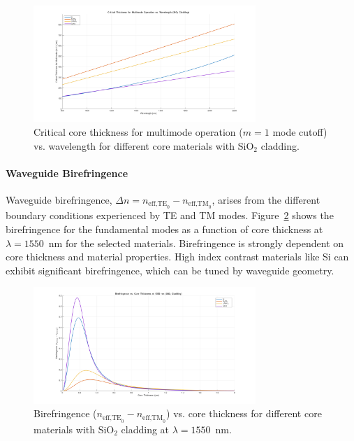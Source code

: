 \documentclass[10pt, a4paper]{article}
\begin{document}
\begin{figure}[h!]
    \centering
    \includegraphics[width=0.75\textwidth]{task1/critical_thickness_multimode_vs_wavelength_materials.png}
    \caption{Critical core thickness for multimode operation ($m=1$ mode cutoff) vs. wavelength for different core materials with SiO$_2$ cladding.}
    \label{fig:critical_thickness_multimode_vs_wavelength_materials}
\end{figure}

\paragraph{Waveguide Birefringence}
Waveguide birefringence, $\Delta n = n_{\text{eff,TE}_0} - n_{\text{eff,TM}_0}$, arises from the different boundary conditions experienced by TE and TM modes. Figure~\ref{fig:birefringence_vs_thickness_materials_1550nm} shows the birefringence for the fundamental modes as a function of core thickness at $\lambda = 1550$~nm for the selected materials. Birefringence is strongly dependent on core thickness and material properties. High index contrast materials like Si can exhibit significant birefringence, which can be tuned by waveguide geometry.

\begin{figure}[h!]
    \centering
    \includegraphics[width=0.75\textwidth]{task1/birefringence_vs_thickness_materials_1550nm.png}
    \caption{Birefringence ($n_{\text{eff,TE}_0} - n_{\text{eff,TM}_0}$) vs. core thickness for different core materials with SiO$_2$ cladding at $\lambda = 1550$~nm.}
    \label{fig:birefringence_vs_thickness_materials_1550nm}
\end{figure}
\end{document}
